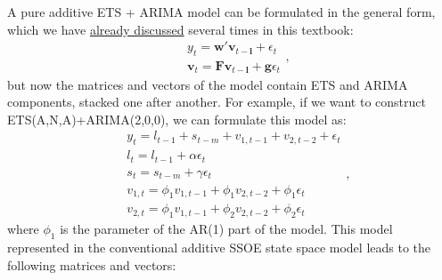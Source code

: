 \documentclass[
]{book}
\theoremstyle{definition}
\theoremstyle{definition}
\theoremstyle{definition}
\theoremstyle{definition}
\theoremstyle{remark}
\begin{document}
A pure additive ETS + ARIMA model can be formulated in the general form, which we have \protect\hyperlink{ADAMETSPureAdditive}{already discussed} several times in this textbook:
\begin{equation*}
  \begin{aligned}
    &{y}_{t} = \mathbf{w}' \mathbf{v}_{t-\boldsymbol{l}} + \epsilon_t \\
    &\mathbf{v}_{t} = \mathbf{F} \mathbf{v}_{t-\boldsymbol{l}} + \mathbf{g} \epsilon_t
  \end{aligned},
\end{equation*}
but now the matrices and vectors of the model contain ETS and ARIMA components, stacked one after another. For example, if we want to construct ETS(A,N,A)+ARIMA(2,0,0), we can formulate this model as:
\begin{equation}
  \begin{aligned}
    &{y}_{t} = l_{t-1} + s_{t-m} + v_{1,t-1} + v_{2,t-2} + \epsilon_t \\
    &l_t = l_{t-1} + \alpha \epsilon_t \\
    &s_t = s_{t-m} + \gamma \epsilon_t \\
    &v_{1,t} = \phi_1 v_{1,t-1} + \phi_1 v_{2,t-2} + \phi_1 \epsilon_t \\
    &v_{2,t} = \phi_1 v_{1,t-1} + \phi_2 v_{2,t-2} + \phi_2 \epsilon_t 
  \end{aligned},
  \label{eq:ADAMETSARIMAANA100}
\end{equation}
where \(\phi_1\) is the parameter of the AR(1) part of the model. This model represented in the conventional additive SSOE state space model leads to the following matrices and vectors:
\end{document}
